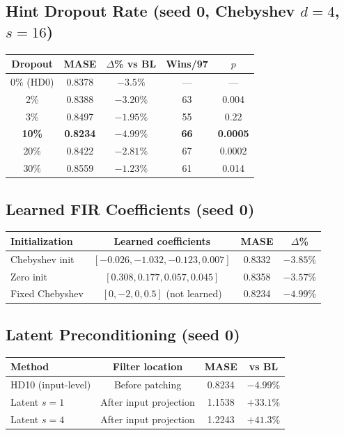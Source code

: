 \documentclass{article}
\begin{document}
\subsection{Hint Dropout Rate (seed 0, Chebyshev $d{=}4$, $s{=}16$)}

\begin{table}[h]
\centering
\small
\begin{tabular}{ccccc}
\toprule
\textbf{Dropout} & \textbf{MASE} & \textbf{$\Delta$\% vs BL} & \textbf{Wins/97} & \textbf{$p$} \\
\midrule
0\% (HD0) & 0.8378 & $-3.5\%$ & --- & --- \\
2\% & 0.8388 & $-3.20\%$ & 63 & 0.004 \\
3\% & 0.8497 & $-1.95\%$ & 55 & 0.22 \\
\textbf{10\%} & \textbf{0.8234} & $\mathbf{-4.99\%}$ & \textbf{66} & \textbf{0.0005} \\
20\% & 0.8422 & $-2.81\%$ & 67 & 0.0002 \\
30\% & 0.8559 & $-1.23\%$ & 61 & 0.014 \\
\bottomrule
\end{tabular}
\end{table}

\subsection{Learned FIR Coefficients (seed 0)}

\begin{table}[h]
\centering
\small
\begin{tabular}{lccc}
\toprule
\textbf{Initialization} & \textbf{Learned coefficients} & \textbf{MASE} & \textbf{$\Delta$\%} \\
\midrule
Chebyshev init & $[-0.026, -1.032, -0.123, 0.007]$ & 0.8332 & $-3.85\%$ \\
Zero init & $[0.308, 0.177, 0.057, 0.045]$ & 0.8358 & $-3.57\%$ \\
Fixed Chebyshev & $[0, -2, 0, 0.5]$ (not learned) & 0.8234 & $-4.99\%$ \\
\bottomrule
\end{tabular}
\end{table}

\subsection{Latent Preconditioning (seed 0)}

\begin{table}[h]
\centering
\small
\begin{tabular}{lccc}
\toprule
\textbf{Method} & \textbf{Filter location} & \textbf{MASE} & \textbf{vs BL} \\
\midrule
HD10 (input-level) & Before patching & 0.8234 & $-4.99\%$ \\
Latent $s{=}1$ & After input projection & 1.1538 & $+33.1\%$ \\
Latent $s{=}4$ & After input projection & 1.2243 & $+41.3\%$ \\
\bottomrule
\end{tabular}
\end{table}
\end{document}
